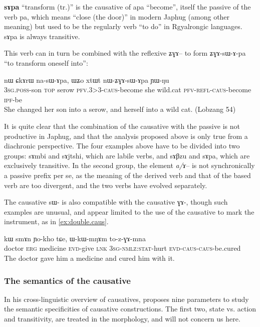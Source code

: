 \documentclass[oldfontcommands,oneside,a4paper,11pt]{article}
\newcommand{\ipa}[1]{{\phon \mbox{#1}}} %
\newcommand{\sg}{\textsc{sg}}
\newcommand{\wav}[1]{}%
\newcommand{\pfv}{\textsc{pfv}}
\newcommand{\caus}{\textsc{caus}}
\newcommand{\lnk}{\textsc{lnk}}
\newcommand{\erg}{\textsc{erg}}
\newcommand{\evd}{\textsc{evd}}
\newcommand{\ipf}{\textsc{ipf}}
\newcommand{\nmlz}{\textsc{nmlz}}
\newcommand{\poss}{\textsc{poss}}
\newcommand{\refl}{\textsc{refl}}
\newcommand{\stat}{\textsc{stat}}
\newcommand{\topic}{\textsc{top}}
\begin{document}
  \textbf{\ipa{sɤpa}} ``transform (tr.)'' is the causative of \ipa{apa} ``become'', itself the passive of the verb \ipa{pa}, which means ``close (the door)'' in modern Japhug (among other meaning) but used to be the  regularly verb ``to do'' in Rgyalrongic languages. \ipa{sɤpa} is always transitive.
  
  This verb can in turn be combined with the reflexive \ipa{ʑɣɤ}-- to form \ipa{ʑɣɤ-sɯ-ɤ-pa} ``to transform oneself into'':
  
  \begin{exe}
\ex
\gll \ipa{ɯ-tɕɯ} 	\ipa{nɯ} 	\ipa{ɕkɤrɯ} 	\ipa{na-sɯ-ɤpa,} 	\ipa{ɯʑo} 	\ipa{xtɯt} 	\ipa{nɯ-ʑɣɤ-sɯ-ɤpa} 	\ipa{ɲɯ-ŋu} \\
3\sg{}.\poss{}-son \topic{} serow \pfv{}.3>3-\caus{}-become she wild.cat \pfv{}-\refl{}-\caus{}-become \ipf{}-be\\
 \glt She changed her son into a serow, and herself into a wild cat.  (Lobzang 54)
\end{exe} 


It is quite clear that the combination of the causative with the passive is not productive in Japhug, and that the analysis proposed above is only true from a diachronic perspective. The four examples above have to be divided into two groups:   \ipa{sɤmbi} and \ipa{sɤjtshi}, which are labile verbs, and \ipa{sɤβzu} and \ipa{sɤpa}, which are exclusively transitive. In the second group,  the element \textit{a/ɤ}-- is not synchronically a passive prefix per se, as the meaning of the derived verb and that of the based verb are too divergent, and the two verbs have evolved separately.


The causative \ipa{sɯ-} is also compatible with the causative \ipa{ɣɤ-}, though such examples are unusual, and appear limited to the use of  the causative to mark the instrument, as in \ref{ex:double.caus}.
 \begin{exe}
\ex  \label{ex:double.caus}
\gll \ipa{smɤnba} 	\ipa{kɯ} 	\ipa{smɤn} 	\ipa{ɲo-kho} 	\ipa{tɕe,} 	\ipa{ɯ-kɯ-mŋɤm} 	\ipa{to-z-ɣɤ-mna}    \\
  doctor \erg{} medicine \evd{}-give \lnk{} 3\sg{}-\nmlz{}:\stat{}-hurt \evd{}-\caus{}-\caus{}-be.cured \\
\glt The doctor gave him a medicine and cured him with it. \wav{8_zGAmna}
\end{exe}
 


\subsubsection{The semantics of the causative } \label{subsub:caus.semantics}
In his cross-linguistic overview of causatives, \citet[62-68]{dixon00causative} proposes nine parameters to study the semantic specificities of causative constructions. The first two, state vs. action and transitivity, are treated in the morphology, and will not concern us here. 
\end{document}
